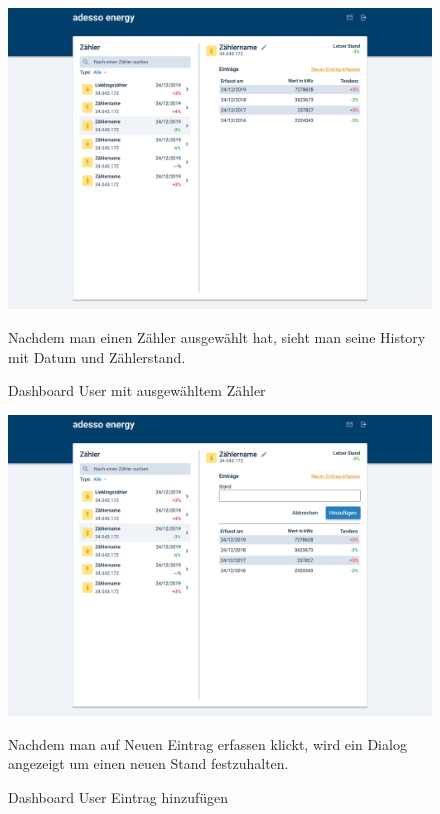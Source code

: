 \newpage

\begin{figure}[h]
	\centering
    \includegraphics[scale=0.3]{img/WebsiteMockup/Dashboard-User-Selected}
	\caption{Dashboard User mit ausgewähltem Zähler} \hfill \break
	Nachdem man einen Zähler ausgewählt hat, sieht man seine History mit Datum und Zählerstand.
\end{figure}

\newpage

\begin{figure}[h]
	\centering
    \includegraphics[scale=0.3]{img/WebsiteMockup/Dashboard-User-Selected-AddEntry}
	\caption{Dashboard User Eintrag hinzufügen} \hfill \break
	Nachdem man auf Neuen Eintrag erfassen klickt, wird ein Dialog angezeigt um einen neuen Stand festzuhalten.
\end{figure}

